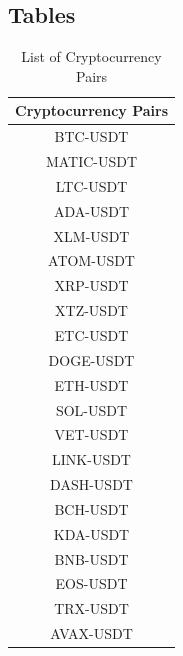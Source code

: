 \documentclass{article}
\begin{document}
\subsection{Tables}
\begin{table}[H]
    \centering
    \caption{List of Cryptocurrency Pairs}
    \label{tab:crypto_pairs}
    \begin{tabular}{|c|}
        \hline
        \textbf{Cryptocurrency Pairs} \\
        \hline
        BTC-USDT \\
        MATIC-USDT \\
        LTC-USDT \\
        ADA-USDT \\
        XLM-USDT \\
        ATOM-USDT \\
        XRP-USDT \\
        XTZ-USDT \\
        ETC-USDT \\
        DOGE-USDT \\
        ETH-USDT \\
        SOL-USDT \\
        VET-USDT \\
        LINK-USDT \\
        DASH-USDT \\
        BCH-USDT \\
        KDA-USDT \\
        BNB-USDT \\
        EOS-USDT \\
        TRX-USDT \\
        AVAX-USDT \\
        \hline
    \end{tabular}
\end{table}
\end{document}
